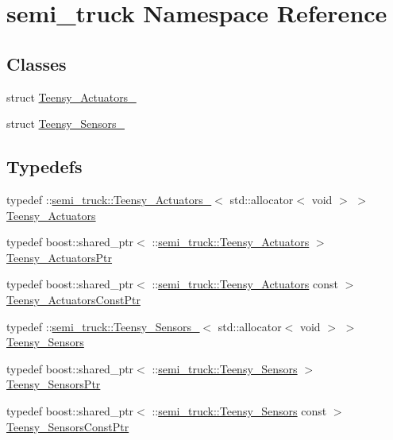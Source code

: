 \hypertarget{namespacesemi__truck}{}\section{semi\+\_\+truck Namespace Reference}
\label{namespacesemi__truck}
\subsection*{Classes}
\begin{DoxyCompactItemize}
\item 
struct \hyperlink{structsemi__truck_1_1_teensy___actuators__}{Teensy\+\_\+\+Actuators\+\_\+}
\item 
struct \hyperlink{structsemi__truck_1_1_teensy___sensors__}{Teensy\+\_\+\+Sensors\+\_\+}
\end{DoxyCompactItemize}
\subsection*{Typedefs}
\begin{DoxyCompactItemize}
\item 
typedef \+::\hyperlink{structsemi__truck_1_1_teensy___actuators__}{semi\+\_\+truck\+::\+Teensy\+\_\+\+Actuators\+\_\+}$<$ std\+::allocator$<$ void $>$ $>$ \hyperlink{namespacesemi__truck_ab8254dd176d8fef1f1381fb4e7e5e869}{Teensy\+\_\+\+Actuators}
\item 
typedef boost\+::shared\+\_\+ptr$<$ \+::\hyperlink{namespacesemi__truck_ab8254dd176d8fef1f1381fb4e7e5e869}{semi\+\_\+truck\+::\+Teensy\+\_\+\+Actuators} $>$ \hyperlink{namespacesemi__truck_a865760e0f4929063a89f6acce25f9bab}{Teensy\+\_\+\+Actuators\+Ptr}
\item 
typedef boost\+::shared\+\_\+ptr$<$ \+::\hyperlink{namespacesemi__truck_ab8254dd176d8fef1f1381fb4e7e5e869}{semi\+\_\+truck\+::\+Teensy\+\_\+\+Actuators} const  $>$ \hyperlink{namespacesemi__truck_a66fc29d018a09cb82a509c3de393001b}{Teensy\+\_\+\+Actuators\+Const\+Ptr}
\item 
typedef \+::\hyperlink{structsemi__truck_1_1_teensy___sensors__}{semi\+\_\+truck\+::\+Teensy\+\_\+\+Sensors\+\_\+}$<$ std\+::allocator$<$ void $>$ $>$ \hyperlink{namespacesemi__truck_a8ffe15bf9a1e739c2242ac6d6feaa67f}{Teensy\+\_\+\+Sensors}
\item 
typedef boost\+::shared\+\_\+ptr$<$ \+::\hyperlink{namespacesemi__truck_a8ffe15bf9a1e739c2242ac6d6feaa67f}{semi\+\_\+truck\+::\+Teensy\+\_\+\+Sensors} $>$ \hyperlink{namespacesemi__truck_a2e84194604862e88522a06e29cff3b7e}{Teensy\+\_\+\+Sensors\+Ptr}
\item 
typedef boost\+::shared\+\_\+ptr$<$ \+::\hyperlink{namespacesemi__truck_a8ffe15bf9a1e739c2242ac6d6feaa67f}{semi\+\_\+truck\+::\+Teensy\+\_\+\+Sensors} const  $>$ \hyperlink{namespacesemi__truck_a47fa34135a8e2aa8c828d29436a9c726}{Teensy\+\_\+\+Sensors\+Const\+Ptr}
\end{DoxyCompactItemize}
